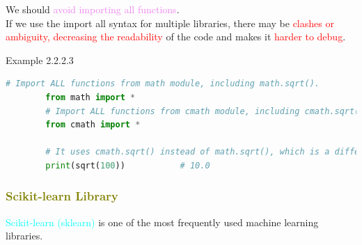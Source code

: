 \documentclass{book}
\begin{document}
We should \textcolor{violet}{avoid importing all functions}. \\
If we use the import all syntax for multiple libraries, there may be \textcolor{red}{clashes or ambiguity, decreasing the readability} of the code and makes it \textcolor{red}{harder to debug}.
\begin{egBox}{Example 2.2.2.3}{}
    \begin{lstlisting}[language=Python, basicstyle=\ttfamily\small, keywordstyle=\color{blue}, commentstyle=\color{forestgreen}, stringstyle=\color{red}, showstringspaces=false]
        # Import ALL functions from math module, including math.sqrt().
        from math import *
        # Import ALL functions from cmath module, including cmath.sqrt().
        from cmath import *

        # It uses cmath.sqrt() instead of math.sqrt(), which is a different implementation.
        print(sqrt(100))           # 10.0
    \end{lstlisting}
\end{egBox}
\textcolor{olive}{\subsubsection{Scikit-learn Library}}
\textcolor{cyan}{Scikit-learn (sklearn)} is one of the most frequently used machine learning libraries.\\
\end{document}
